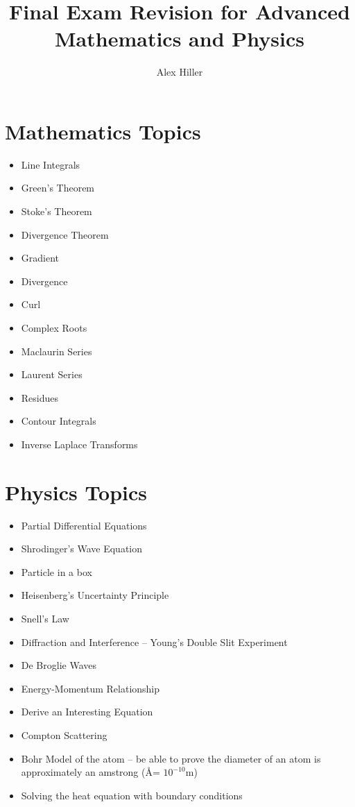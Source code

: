 \documentclass{article}
\author{Alex Hiller}
\title{Final Exam Revision for Advanced Mathematics and Physics}
\begin{document}
\maketitle
\tableofcontents


\clearpage
\section{Mathematics Topics}
\begin{itemize}
  \item Line Integrals
  \item Green's Theorem
  \item Stoke's Theorem
  \item Divergence Theorem
  \item Gradient
  \item Divergence
  \item Curl
  \item Complex Roots
  \item Maclaurin Series 
  \item Laurent Series
  \item Residues
  \item Contour Integrals
  \item Inverse Laplace Transforms
\end{itemize}


\section{Physics Topics}
\begin{itemize}
  \item Partial Differential Equations
  \item Shrodinger's Wave Equation
  \item Particle in a box
  \item Heisenberg's Uncertainty Principle
  \item Snell's Law
  \item Diffraction and Interference -- Young's Double Slit Experiment
  \item De Broglie Waves
  \item Energy-Momentum Relationship
  \item Derive an Interesting Equation
  \item Compton Scattering
  \item Bohr Model of the atom --  be able to prove the diameter of an atom is 
    approximately an amstrong (\AA = $ 10^{-10} $m)
  \item Solving the heat equation with boundary conditions
\end{itemize}
\end{document}
